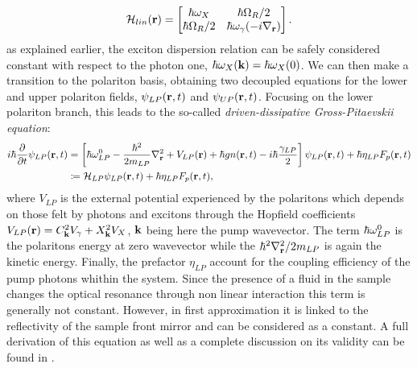 \begin{equation}
    \mathcal{H}_{lin}(\mathbf{r})
    = 
    \begin{bmatrix}
    \hbar \omega_X & \hbar \Omega_R / 2 \\
    \hbar \Omega_R / 2 & \hbar \omega_\gamma(-i \nabla_{\mathbf{r}})  
    \end{bmatrix}.
\end{equation}
as explained earlier, the exciton dispersion relation can be safely considered constant with respect to the photon one, $\hbar \omega_X(\mathbf{k})=\hbar \omega_X(0)$.
We can then make a transition to the polariton basis, obtaining two decoupled equations for the lower and upper polariton fields, $\psi_{LP}(\mathbf{r},t)$ and $\psi_{UP}(\mathbf{r},t)$. Focusing on the lower polariton branch, this leads to the so-called \textit{driven-dissipative Gross-Pitaevskii equation}:
\begin{equation}
    \begin{align}
    i \hbar \dfrac{\partial}{\partial t} \psi_{LP}(\mathbf{r}, t) &= \left[ \hbar \omega_{LP}^0 -\dfrac{\hbar^2}{2 m_{LP}}\nabla_{\mathbf{r}}^2 + V_{LP}(\mathbf{r}) + \hbar g n(\mathbf{r}, t) - i \hbar \dfrac{\gamma_{LP}}{2} \right] \psi_{LP}(\mathbf{r}, t) + \hbar \eta_{LP} F_p(\mathbf{r}, t) \\
        &\coloneq \mathcal{H}_{LP} \psi_{LP}(\mathbf{r}, t) + \hbar \eta_{LP} F_p(\mathbf{r}, t),
    \end{align}
    \label{eq:generalized_GPE}
\end{equation}
where $V_{LP}$ is the external potential experienced by the polaritons which depends on those felt by photons and excitons through the Hopfield 
coefficients $V_{LP}(\mathbf{r}) = C^2_{\mathbf{k}} V_{\gamma} + X^2_{\mathbf{k}} V_{X}$, $\mathbf{k}$ being here the pump wavevector. The term $\hbar \omega_{LP}^0$ is the polaritons energy at zero wavevector while the $\hbar^2\nabla^2_{\mathbf{r}} /2m_{LP}$ is again the kinetic energy. Finally, the prefactor $\eta_{LP}$ account for the coupling efficiency of the pump photons whithin the system.
Since the presence of a fluid in the sample changes the optical resonance through non linear interaction this term is generally not constant. However, in first approximation it is linked to the reflectivity of the sample front mirror and can be considered as a constant. A full derivation of this equation as well as a complete discussion on its validity can be found in \cite{carusotto_quantum_2013}.

\bigskip


